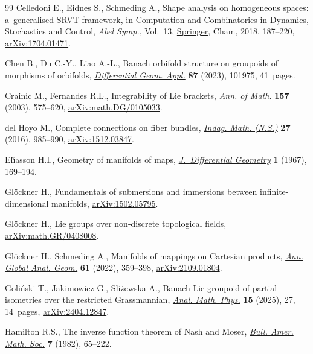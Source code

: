 \documentclass[pdftex]{sigma}
\numberwithin{equation}{section}
\begin{document}
\begin{thebibliography}{99}
Celledoni E., Eidnes S., Schmeding A., Shape analysis on homogeneous spaces:
 a~generalised {SRVT} framework, in Computation and Combinatorics in Dynamics,
 Stochastics and Control, \textit{Abel Symp.}, Vol.~13,
 \href{https://doi.org/10.1007/978-3-030-01593-0_7}{Springer}, Cham, 2018,
 187--220, \href{http://arxiv.org/abs/1704.01471}{arXiv:1704.01471}.

Chen B., Du C.-Y., Liao A.-L., Banach orbifold structure on groupoids of
 morphisms of orbifolds,
 \href{https://doi.org/10.1016/j.difgeo.2023.101975}{\textit{Differential
 Geom. Appl.}} \textbf{87} (2023), 101975, 41~pages.

Crainic M., Fernandes R.L., Integrability of {L}ie brackets,
 \href{https://doi.org/10.4007/annals.2003.157.575}{\textit{Ann. of Math.}}
 \textbf{157} (2003), 575--620,
 \href{http://arxiv.org/abs/math.DG/0105033}{arXiv:math.DG/0105033}.

del Hoyo M., Complete connections on fiber bundles,
 \href{https://doi.org/10.1016/j.indag.2016.06.009}{\textit{Indag. Math.
 (N.S.)}} \textbf{27} (2016), 985--990,
 \href{http://arxiv.org/abs/1512.03847}{arXiv:1512.03847}.

El\u{\i}asson H.I., Geometry of manifolds of maps,
 \href{https://doi.org/10.4310/jdg/1214427887}{\textit{J.~Differential
 Geometry}} \textbf{1} (1967), 169--194.

Gl\"ockner H., Fundamentals of submersions and immersions between
 infinite-dimensional manifolds,
 \href{http://arxiv.org/abs/1502.05795}{arXiv:1502.05795}.

Gl\"ockner H., Lie groups over non-discrete topological fields,
 \href{http://arxiv.org/abs/math.GR/0408008}{arXiv:math.GR/0408008}.

Gl\"ockner H., Schmeding A., Manifolds of mappings on {C}artesian products,
 \href{https://doi.org/10.1007/s10455-021-09816-y}{\textit{Ann. Global Anal.
 Geom.}} \textbf{61} (2022), 359--398,
 \href{http://arxiv.org/abs/2109.01804}{arXiv:2109.01804}.

Goli\'nski T., Jakimowicz G., Sli\.zewska A., Banach {L}ie groupoid of partial
 isometries over the restricted {G}rassmannian,
 \href{https://doi.org/10.1007/s13324-025-01028-y}{\textit{Anal. Math. Phys.}}
 \textbf{15} (2025), 27, 14~pages,
 \href{http://arxiv.org/abs/2404.12847}{arXiv:2404.12847}.

Hamilton R.S., The inverse function theorem of {N}ash and {M}oser,
 \href{https://doi.org/10.1090/S0273-0979-1982-15004-2}{\textit{Bull. Amer.
 Math. Soc.}} \textbf{7} (1982), 65--222.


\end{thebibliography}
\end{document}
